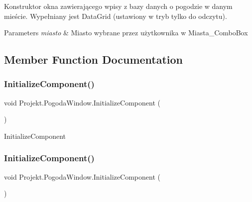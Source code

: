 Konstruktor okna zawierającego wpisy z bazy danych o pogodzie w danym mieście. Wypełniany jest Data\+Grid (ustawiony w tryb tylko do odczytu). 


\begin{DoxyParams}{Parameters}
{\em miasto} & Miasto wybrane przez użytkownika w Miasta\+\_\+\+Combo\+Box\\
\hline
\end{DoxyParams}


\subsection{Member Function Documentation}
\mbox{\label{class_projekt_1_1_pogoda_window_a6800b0c504dd7256b2bcfb3352b6206f}} 
\subsubsection{\texorpdfstring{InitializeComponent()}{InitializeComponent()}\hspace{0.1cm}{\footnotesize\ttfamily [1/4]}}
{\footnotesize\ttfamily void Projekt.\+Pogoda\+Window.\+Initialize\+Component (\begin{DoxyParamCaption}{ }\end{DoxyParamCaption})}



Initialize\+Component 

\mbox{\label{class_projekt_1_1_pogoda_window_a6800b0c504dd7256b2bcfb3352b6206f}} 
\subsubsection{\texorpdfstring{InitializeComponent()}{InitializeComponent()}\hspace{0.1cm}{\footnotesize\ttfamily [2/4]}}
{\footnotesize\ttfamily void Projekt.\+Pogoda\+Window.\+Initialize\+Component (\begin{DoxyParamCaption}{ }\end{DoxyParamCaption})}



